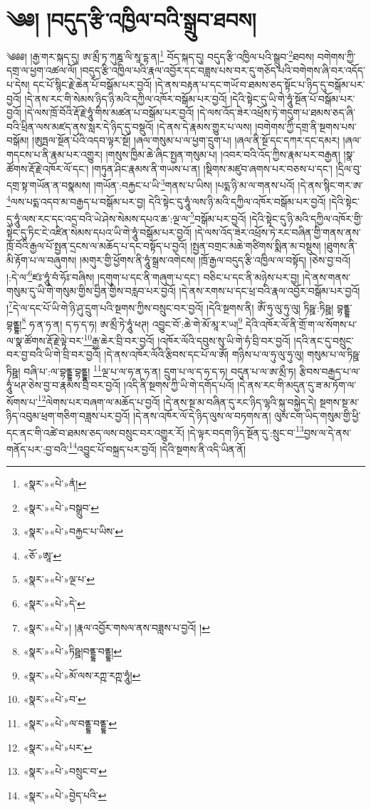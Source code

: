 \chapter{༄༅། །བདུད་རྩི་འཁྱིལ་བའི་སྒྲུབ་ཐབས།}༄༅༅། །རྒྱ་གར་སྐད་དུ། ཨ་མྲྀ་ཏ་ཀུཎྜ་ལི་སཱ་དྷ་ན།\footnote{«སྣར་»«པེ་»ནཾ།} བོད་སྐད་དུ། བདུད་རྩི་འཁྱིལ་པའི་སྒྲུབ་\footnote{«སྣར་»«པེ་»བསྒྲུབ་}ཐབས། བགེགས་ཀྱི་དགྲ་ལ་ཕྱག་འཚལ་ལོ། །བདུད་རྩི་འཁྱིལ་པའི་རྣལ་འབྱོར་དང་བཟླས་པས་བར་དུ་གཅོད་པའི་བགེགས་ཞི་བར་འདོད་པ་དེས། དང་པོ་སྙིང་རྗེ་ཆེན་པོ་བསྒོམ་པར་བྱའོ། །དེ་ནས་བརྟན་པ་དང་གཡོ་བ་ཐམས་ཅད་སྟོང་པ་ཉིད་དུ་བསྒོམ་པར་བྱའོ། །དེ་ནས་རང་གི་སེམས་ཉིད་ཉི་མའི་དཀྱིལ་འཁོར་བསྒོམ་པར་བྱའོ། །དེའི་སྟེང་དུ་ཡི་གེ་ཧཱུཾ་སྔོན་པོ་བསྒོམ་པར་བྱའོ། །དེ་ལས་ཁྲོ་བོའི་རྡོ་རྗེ་ཧཱུཾ་གིས་མཚན་པ་བསྒོམ་པར་བྱའོ། །དེ་ལས་འོད་ཟེར་འཕྲོས་ཏེ་གདུག་པ་ཐམས་ཅད་ཞི་བའི་ཕྲིན་ལས་མཛད་ནས་སླར་དེ་ཉིད་དུ་བསྡུའོ། །དེ་ནས་དེ་རྣམས་གྱུར་པ་ལས། །བགེགས་ཀྱི་དགྲ་ནི་སྔགས་པས་བསྒོམ། །ཨུཏྤལ་སྔོན་པོའི་འདབ་ལྟར་སྔོ། །ཞལ་གསུམ་པ་ལ་ཕྱག་དྲུག་པ། །ཞལ་ནི་སྔོ་དང་དཀར་དང་དམར། །ཞལ་གདངས་པ་ནི་རྣམ་པར་འགྱུར། །གསུས་ཁྱིམ་ཆེ་ཞིང་སྤྱན་གསུམ་པ། །འབར་བའི་འོད་ཀྱིས་རྣམ་པར་བརྒྱན། །སྣ་ཚོགས་རྡོ་རྗེ་འཁོར་ལོ་དང་། །གཏུན་ཤིང་རྣམས་ནི་གཡས་པ་ན། །སྡིགས་མཛུབ་ཞགས་པར་བཅས་པ་དང་། །དྲིལ་བུ་དགྲ་སྟ་གཡོན་ན་བསྣམས། །གཡོན་:བརྐྱང་པ་ཡི་\footnote{«སྣར་»«པེ་»བརྐྱང་པ་ཡིས་}གནས་པ་ཡིས། །པདྨ་ཉི་མ་ལ་གནས་པའོ། །དེ་ནས་སྙིང་གར་ཨ་\footnote{«ཅོ་»ཨཱ་}ལས་པདྨ་འདབ་མ་བརྒྱད་པ་བསྒོམ་པར་བྱ། དེའི་སྟེང་དུ་ཧཱུཾ་ལས་ཉི་མའི་དཀྱིལ་འཁོར་བསྒོམ་པར་བྱའོ། །དེའི་སྟེང་དུ་ཧཱུཾ་ལས་རང་དང་འདྲ་བའི་ཡེ་ཤེས་སེམས་དཔའ་ཆ་:ལྔ་ལ་\footnote{«སྣར་»«པེ་»ལྔ་པ་}བསྒོམ་པར་བྱའོ། །དེའི་སྟེང་དུ་ཉི་མའི་དཀྱིལ་འཁོར་གྱི་སྟེང་དུ་ཏིང་ངེ་འཛིན་སེམས་དཔའ་ཡི་གེ་ཧཱུཾ་བསྒོམ་པར་བྱའོ། །དེ་ལས་འོད་ཟེར་འཕྲོས་ཏེ་རང་བཞིན་གྱི་གནས་ནས་ཁྲོ་བོའི་རྒྱལ་པོ་སྤྱན་དྲངས་ལ་མཆོད་པ་དང་བསྟོད་པ་བྱའོ། །སྤྱན་བགྲང་མཆེ་གཙིགས་སྨིན་མ་བསྡུས། །ཐུགས་ནི་མི་རྟོག་པ་ལ་བཞུགས། །མགུར་གྱི་ཕྱོགས་ནི་ཧཱུཾ་སྒྲས་འགེངས། །ཁྲོ་རྒྱལ་བདུད་རྩི་འཁྱིལ་ལ་བསྟོད། །ཅེས་བྱ་བའོ། །:དེ་ལ་\footnote{«སྣར་»«པེ་»དེ་}ཛཿ་ཧཱུཾ་བཾ་ཧོཿ་བཞིས། །དགུག་པ་དང་ནི་གཞུག་པ་དང་། བཅིང་པ་དང་ནི་མཉེས་པར་བྱ། །དེ་ནས་གནས་གསུམ་དུ་ཡི་གེ་གསུམ་གྱིས་བྱིན་གྱིས་བརླབ་པར་བྱའོ། །དེ་ནས་རགས་པ་དང་ཕྲ་བའི་རྣལ་འབྱོར་བསྒོམ་པར་བྱའོ། །\footnote{«སྣར་»«པེ་»། །རྣལ་འབྱོར་གསལ་ནས་བཟླས་པ་བྱའོ། །}དེ་ལ་དང་པོ་ཡི་གེ་ཉི་ཤུ་དྲུག་པའི་སྔགས་ཀྱིས་བསྲུང་བར་བྱའོ། །དེའི་སྔགས་ནི། ཨོཾ་ཧུ་ལུ་ཧུ་ལུ། ཏིཥྛ་:ཏིཥྛ། བྷནྡྷ་བྷནྡྷ།\footnote{«སྣར་»«པེ་»ཏིཥྛ།བནྡྷ་བནྡྷ།} ཧ་ན་ཧ་ན། ད་ཧ་ད་ཧ། ཨ་མྲྀ་ཏེ་ཧཱུཾ་ཕཊ། འབྱུང་བོ་:ཆེ་གེ་མོ་མཱ་ར་ཡ།\footnote{«སྣར་»«པེ་»མོ་ལས་རཀྵ་རཀྵ་ཧཱུཾ།} དེའི་འཁོར་ལོ་ནི་གྲོ་ག་ལ་སོགས་པ་ལ་སྣ་ཚོགས་རྡོ་རྗེ་ལྟེ་བར་\footnote{«སྣར་»«པེ་»བ་}རྒྱ་ཆེར་བྲི་བར་བྱའོ། །འཁོར་ལོའི་དབུས་སུ་ཡི་གེ་ཧཾ་བྲི་བར་བྱའོ། །དའི་ནང་དུ་བསྲུང་བར་བྱ་བའི་ཡི་གེ་བྲི་བར་བྱའོ། །དེ་ནས་འཁོར་ལོའི་རྩིབས་དང་པོ་ལ་ཨོཾ། གཉིས་པ་ལ་ཧུ་ལུ་ཧུ་ལུ། གསུམ་པ་ལ་ཏིཥྛ་ཏིཥྛ། བཞི་པ་:ལ་བྷནྡྷ་བྷནྡྷ། \footnote{«སྣར་»«པེ་»ལ་བནྡྷ་བནྡྷ་}ལྔ་པ་ལ་ཧ་ན་ཧ་ན། དྲུག་པ་ལ་ད་ཧ་ད་ཧ། བདུན་པ་ལ་ཨ་མྲྀ་ཏ། རྩིབས་བརྒྱད་པ་ལ་ཧཱུཾ་ཕཊ་ཅེས་བྱ་བ་རྣམས་བྲི་བར་བྱའོ། །འདི་ནི་སྔགས་ཀྱི་ཡི་གེ་དགོད་པའོ། །དེ་ནས་རང་གི་མདུན་དུ་ཟ་མ་ཏོག་ལ་སོགས་པ་\footnote{«སྣར་»«པེ་»པར་}ལེགས་པར་བཞག་ལ་མཆོད་པ་བྱའོ། །དེ་ནས་སྔ་མ་བཞིན་དུ་རང་ཉིད་ལྷའི་སྐུ་བསྐྱེད་དེ། སྔགས་སྔ་མ་ཉིད་འབུམ་ཕྲག་གཅིག་བཟླས་པར་བྱའོ། །དེ་ནས་འཁོར་ལོ་དེ་ཉིད་ལུས་ལ་བཏགས་ན། ལུས་ངག་ཡིད་གསུམ་གྱི་ཕྱི་དང་ནང་གི་འཚེ་བ་ཐམས་ཅད་ལས་བསྲུང་བར་འགྱུར་རོ། །དེ་ལྟར་བདག་ཉིད་སྔོན་དུ་:སྲུང་བ་\footnote{«སྣར་»«པེ་»བསྲུང་བ་}བྱས་ལ་དེ་ནས་གནོད་པར་:བྱ་བའི་\footnote{«སྣར་»«པེ་»བྱེད་པའི་}འབྱུང་པོ་བསྐྲད་པར་བྱའོ། །དེའི་སྔགས་ནི་འདི་ཡིན་ནོ། 